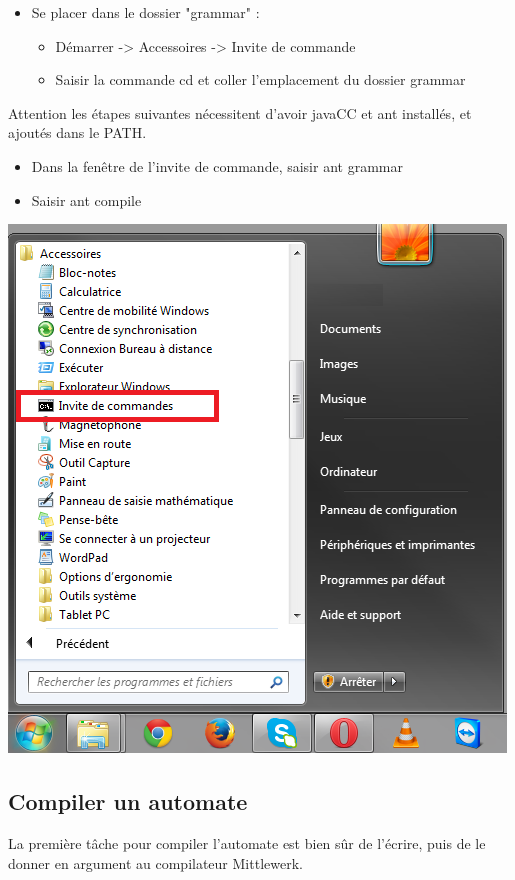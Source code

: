 \documentclass[a4paper,11pt]{article}
\begin{document}
\begin{itemize}
	\item Se placer dans le dossier "grammar" :	
	\begin{itemize}
					\item Démarrer -> Accessoires -> Invite de commande
					\item Saisir la commande cd et coller l'emplacement du dossier grammar 
	\end{itemize}
\end{itemize}

Attention les étapes suivantes nécessitent d'avoir javaCC et ant installés, et ajoutés dans le PATH.

\begin{itemize}
	\item Dans la fenêtre de l'invite de commande, saisir ant grammar
	\item Saisir ant compile
\end{itemize}
		
\begin{center}
	\includegraphics[scale=0.75]{img/cmd.png}
\end{center}


\subsection{Compiler un automate}
La première tâche pour compiler l'automate est bien sûr de l'écrire, puis de le donner en argument au compilateur Mittlewerk.\newline
\end{document}
